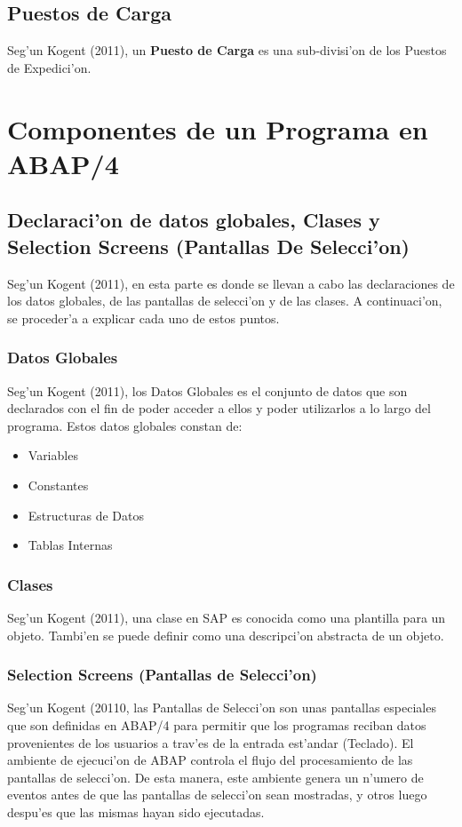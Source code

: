 \subsection{Puestos de Carga}
	Seg'un Kogent (2011), un \textbf{Puesto de Carga} es una sub-divisi'on de los Puestos de Expedici'on. 

\section{Componentes de un Programa en ABAP/4} \label{sect:proabap}
\subsection{Declaraci'on de datos globales, Clases y Selection Screens  (Pantallas De Selecci'on)}
	Seg'un Kogent (2011), en esta parte es donde se llevan a cabo las declaraciones de los datos globales, de las pantallas de selecci'on y de las clases. A continuaci'on, se proceder'a a explicar cada uno de estos puntos.
\subsubsection*{Datos Globales}
	Seg'un Kogent (2011), los Datos Globales es el conjunto de datos que son declarados con el fin de poder acceder a ellos y poder utilizarlos a lo largo del programa. Estos datos globales constan de:
\begin{itemize}
\item Variables
\item Constantes
\item Estructuras de Datos
\item Tablas Internas
\end{itemize}

\subsubsection*{Clases}
	Seg'un Kogent (2011), una clase en SAP es conocida como una plantilla para un objeto. Tambi'en se puede definir como una descripci'on abstracta de un objeto.

\subsubsection*{Selection Screens (Pantallas de Selecci'on)}
	Seg'un Kogent (20110, las Pantallas de Selecci'on son unas pantallas especiales que son definidas en ABAP/4 para permitir que los programas reciban datos provenientes de los usuarios a trav'es de la entrada est'andar (Teclado). El ambiente de ejecuci'on de ABAP controla el flujo del procesamiento de las pantallas de selecci'on. De esta manera, este ambiente genera un n'umero de eventos antes de que las pantallas de selecci'on sean mostradas, y otros luego despu'es que las mismas hayan sido ejecutadas.
	

